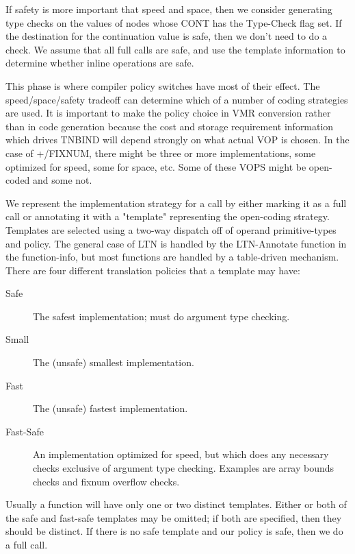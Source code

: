 If safety is more important that speed and space, then we consider generating
type checks on the values of nodes whose CONT has the Type-Check flag set.  If
the destination for the continuation value is safe, then we don't need to do
a check.  We assume that all full calls are safe, and use the template
information to determine whether inline operations are safe.

This phase is where compiler policy switches have most of their effect.  The
speed/space/safety tradeoff can determine which of a number of coding
strategies are used.  It is important to make the policy choice in VMR
conversion rather than in code generation because the cost and storage
requirement information which drives TNBIND will depend strongly on what actual
VOP is chosen.  In the case of +/FIXNUM, there might be three or more
implementations, some optimized for speed, some for space, etc.  Some of these
VOPS might be open-coded and some not.

We represent the implementation strategy for a call by either marking it as a
full call or annotating it with a "template" representing the open-coding
strategy.  Templates are selected using a two-way dispatch off of operand
primitive-types and policy.  The general case of LTN is handled by the
LTN-Annotate function in the function-info, but most functions are handled by a
table-driven mechanism.  There are four different translation policies that a
template may have:
\begin{description}
\item[Safe]
        The safest implementation; must do argument type checking.

\item[Small]
        The (unsafe) smallest implementation.

\item[Fast]
        The (unsafe) fastest implementation.

\item[Fast-Safe]
        An implementation optimized for speed, but which does any necessary
        checks exclusive of argument type checking.  Examples are array bounds
        checks and fixnum overflow checks.
\end{description}

Usually a function will have only one or two distinct templates.  Either or
both of the safe and fast-safe templates may be omitted; if both are specified,
then they should be distinct.  If there is no safe template and our policy is
safe, then we do a full call.

